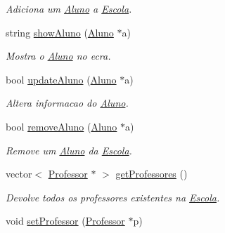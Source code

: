 \begin{DoxyCompactItemize}
\begin{DoxyCompactList}\small\item\em Adiciona um \hyperlink{class_aluno}{Aluno} a \hyperlink{class_escola}{Escola}. \end{DoxyCompactList}\item 
\hypertarget{class_escola_a61476572624adfbc5ff2a0dce1e8ce0b}{string \hyperlink{class_escola_a61476572624adfbc5ff2a0dce1e8ce0b}{show\-Aluno} (\hyperlink{class_aluno}{Aluno} $\ast$a)}\label{class_escola_a61476572624adfbc5ff2a0dce1e8ce0b}

\begin{DoxyCompactList}\small\item\em Mostra o \hyperlink{class_aluno}{Aluno} no ecra. \end{DoxyCompactList}\item 
\hypertarget{class_escola_ab8ae7317b753dbe8308a60ac39d4f714}{bool \hyperlink{class_escola_ab8ae7317b753dbe8308a60ac39d4f714}{update\-Aluno} (\hyperlink{class_aluno}{Aluno} $\ast$a)}\label{class_escola_ab8ae7317b753dbe8308a60ac39d4f714}

\begin{DoxyCompactList}\small\item\em Altera informacao do \hyperlink{class_aluno}{Aluno}. \end{DoxyCompactList}\item 
\hypertarget{class_escola_acfa55addf5866a486acdfdc84ee9c66a}{bool \hyperlink{class_escola_acfa55addf5866a486acdfdc84ee9c66a}{remove\-Aluno} (\hyperlink{class_aluno}{Aluno} $\ast$a)}\label{class_escola_acfa55addf5866a486acdfdc84ee9c66a}

\begin{DoxyCompactList}\small\item\em Remove um \hyperlink{class_aluno}{Aluno} da \hyperlink{class_escola}{Escola}. \end{DoxyCompactList}\item 
\hypertarget{class_escola_a8cdb86f03082f15f5f3ce63d1ae0b1f2}{vector$<$ \hyperlink{class_professor}{Professor} $\ast$ $>$ \hyperlink{class_escola_a8cdb86f03082f15f5f3ce63d1ae0b1f2}{get\-Professores} ()}\label{class_escola_a8cdb86f03082f15f5f3ce63d1ae0b1f2}

\begin{DoxyCompactList}\small\item\em Devolve todos os professores existentes na \hyperlink{class_escola}{Escola}. \end{DoxyCompactList}\item 
\hypertarget{class_escola_a69bc6d8eb743a508d2b805285fd59e35}{void \hyperlink{class_escola_a69bc6d8eb743a508d2b805285fd59e35}{set\-Professor} (\hyperlink{class_professor}{Professor} $\ast$p)}\label{class_escola_a69bc6d8eb743a508d2b805285fd59e35}


\end{DoxyCompactItemize}
